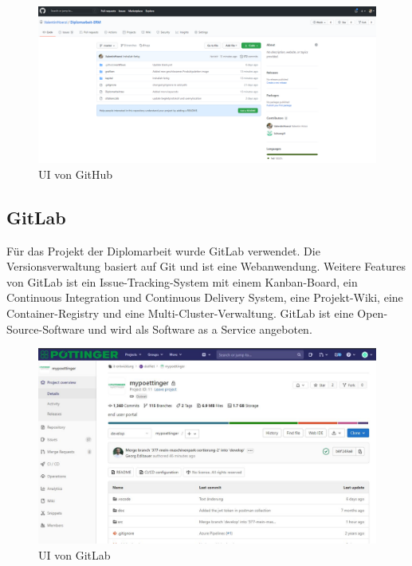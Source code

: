 \begin{figure}[H]
	\centerline{
		\includegraphics[width=1\textwidth, frame]{./grafiken/github_screen.png}
	}
	\vskip0pt
	\caption{UI von GitHub} \label{fig:github}
\end{figure}

\subsection{GitLab}
Für das Projekt der Diplomarbeit wurde GitLab verwendet. Die Versionsverwaltung basiert auf Git und ist eine Webanwendung. Weitere Features von GitLab ist ein Issue-Tracking-System mit einem Kanban-Board, ein Continuous Integration und Continuous Delivery System, eine Projekt-Wiki, eine Container-Registry und eine Multi-Cluster-Verwaltung. GitLab ist eine Open-Source-Software und wird als Software as a Service angeboten. \autocite{wikiGitLab}

\begin{figure}[H]
	\centerline{
		\includegraphics[width=1\textwidth, frame]{./grafiken/gitlab_startseite.JPG}
	}
	\vskip0pt
	\caption{UI von GitLab}
\end{figure}
